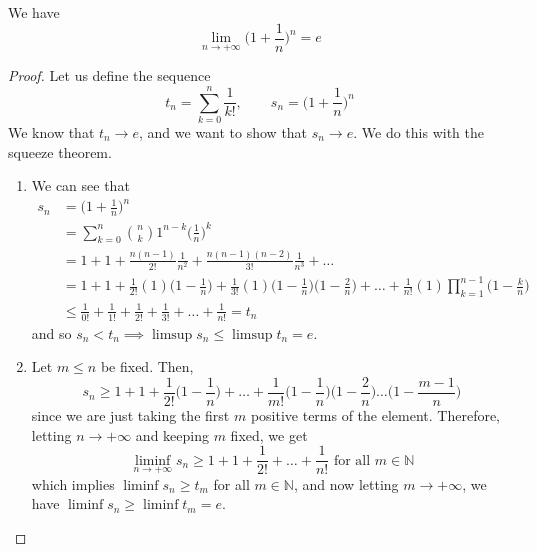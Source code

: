   \begin{theorem}
    We have 
    \begin{equation}
      \lim_{n \rightarrow +\infty} \bigg( 1 + \frac{1}{n} \bigg)^n = e 
    \end{equation}
  \end{theorem}
  \begin{proof}
    Let us define the sequence 
    \begin{equation}
      t_n = \sum_{k=0}^n \frac{1}{k!}, \qquad s_n = \bigg( 1 + \frac{1}{n} \bigg)^n
    \end{equation}
    We know that $t_n \rightarrow e$, and we want to show that $s_n \rightarrow e$. We do this with the squeeze theorem. 
    \begin{enumerate}
      \item We can see that 
      \begin{align}
        s_n & = \bigg( 1 + \frac{1}{n} \bigg)^n \\ 
            & = \sum_{k=0}^n \binom{n}{k} 1^{n-k} \bigg( \frac{1}{n} \bigg)^k \\
            & = 1 + 1 + \frac{n(n-1)}{2!} \frac{1}{n^2} + \frac{n(n-1)(n-2)}{3!} \frac{1}{n^3} + \ldots \\ 
            & = 1 + 1 + \frac{1}{2!} (1) \bigg( 1 - \frac{1}{n} \bigg) + \frac{1}{3!} (1) \bigg(1 - \frac{1}{n} \bigg) \bigg(1 - \frac{2}{n} \bigg) + \ldots + \frac{1}{n!} (1) \prod_{k=1}^{n-1} \bigg(1 - \frac{k}{n} \bigg) \\
            & \leq \frac{1}{0!} + \frac{1}{1!} + \frac{1}{2!} + \frac{1}{3!} + \ldots + \frac{1}{n!} = t_n 
      \end{align}
      and so $s_n < t_n \implies \limsup s_n \leq \limsup t_n = e$. 

      \item Let $m \leq n$ be fixed. Then, 
      \begin{equation}
        s_n \geq 1 + 1 + \frac{1}{2!} \bigg( 1 - \frac{1}{n} \bigg) + \ldots + \frac{1}{m!} \bigg(1 - \frac{1}{n} \bigg) \bigg(1 - \frac{2}{n} \bigg) \ldots \bigg(1 - \frac{m-1}{n} \bigg) 
      \end{equation}
      since we are just taking the first $m$ positive terms of the element. Therefore, letting $n \rightarrow +\infty$ and keeping $m$ fixed, we get 
      \begin{equation}
        \liminf_{n \rightarrow +\infty} s_n \geq 1 + 1 + \frac{1}{2!} + \ldots + \frac{1}{n!} \text{ for all } m \in \mathbb{N}
      \end{equation}
      which implies $\liminf s_n \geq t_m$ for all $m \in \mathbb{N}$, and now letting $m \rightarrow +\infty$, we have $\liminf s_n \geq \liminf t_m = e$. 
    \end{enumerate}
  \end{proof}

